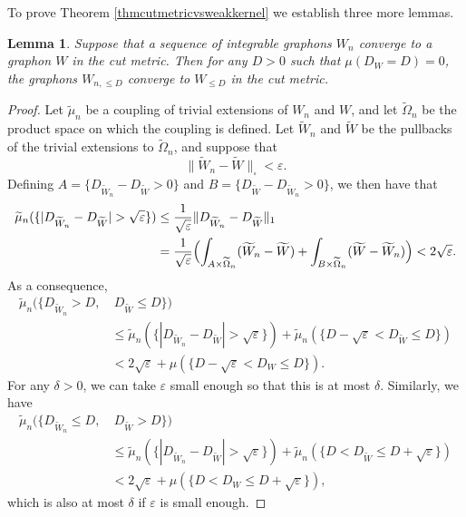 \documentclass{amsart}
\numberwithin{equation}{section}
\numberwithin{figure}{section}
\newtheorem{lemma}[theorem]{Lemma}
\theoremstyle{definition}
\theoremstyle{remark}
\newcommand{\eps}{\varepsilon}
\newcommand{\wOmega}{{\widetilde{\Omega}}}
\newcommand{\wmu}{\widetilde{\mu}}
\newcommand{\wW}{\widetilde{W}}
\begin{document}
To prove Theorem \ref{thmcutmetricvsweakkernel} we establish three more
lemmas.

\begin{lemma} \label{lemmacutmetricrestrictedtoD}
Suppose that a sequence of integrable graphons $W_n$ converge to a graphon
$W$ in the cut metric. Then for any $D>0$ such that $\mu(D_W=D)=0$, the
graphons $W_{n,\le D}$ converge to $W_{\le D}$ in the cut metric.
\end{lemma}

\begin{proof}
Let $\wmu_n$ be a coupling of trivial extensions of $W_n$ and $W$, and let
$\wOmega_n$ be the product space on which the coupling is defined. Let
$\wW_n$ and $\wW$ be the pullbacks of the trivial extensions to $\wOmega_n$,
and suppose that
\[\|\wW_n-\wW\|_\square < \varepsilon.\]
Defining $A=\{D_{\wW_n}-D_{\wW}>0\}$ and $B=\{D_{\wW}-D_{\wW_n}>0\}$, we then
have that
\begin{align*}
\wmu_n(\{|D_{\wW_n}-D_{\wW}|>\sqrt{\varepsilon}\})
&\leq \frac 1{\sqrt\eps}\|D_{\wW_n}-D_{\wW}\|_1\\
&= \frac
1{\sqrt\eps}\Bigl(\int_{A\times \wOmega_n}({\wW_n}-{\wW})+\int_{B\times
\wOmega_n}({\wW}-{\wW_n})\Bigr)
 <2\sqrt{\varepsilon} .
\end{align*}
As a consequence,
\begin{align*}
\wmu_n(\{D_{\wW_n}>D,&\ D_{\wW} \le D\})
\\
&\le
\wmu_n(\{|D_{\wW_n}-D_{\wW}|>\sqrt{\varepsilon}\})
 +\wmu_n(\{D-\sqrt{\varepsilon}<D_{\wW}\le D\})
\\
&<2\sqrt{\varepsilon}+\mu(\{D-\sqrt{\varepsilon}<D_W\le D\}).
\end{align*}
For any $\delta>0$, we can take $\varepsilon$ small enough so that this is at
most $\delta$. Similarly, we have
\begin{align*}
\wmu_n(\{D_{\wW_n}\le D,&\ D_{\wW} > D\})
\\
&\le \wmu_n(\{|D_{\wW_n}-D_{\wW}|>\sqrt{\varepsilon}\})
+\wmu_n(\{D<D_{\wW}\le D+\sqrt{\varepsilon}\})
\\
& < 2\sqrt{\varepsilon}+\mu(\{D<D_W\le D+\sqrt{\varepsilon}\}),
\end{align*}
which is also at most $\delta$ if $\varepsilon$ is small enough.


\end{proof}
\end{document}
